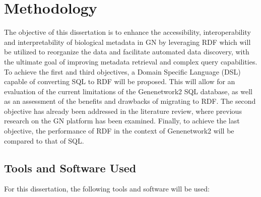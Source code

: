 \chapter{Methodology}

The objective of this dissertation is to enhance the accessibility, interoperability and interpretability of biological metadata in GN by leveraging RDF which will be utilized to reorganize the data and facilitate automated data discovery, with the ultimate goal of improving metadata retrieval and complex query capabilities.  To achieve the first and third objectives, a Domain Specific Language (DSL) capable of converting SQL to RDF will be proposed.  This will allow for an evaluation of the current limitations of the Genenetwork2 SQL database, as well as an assessment of the benefits and drawbacks of migrating to RDF.  The second objective has already been addressed in the literature review, where previous research on the GN platform has been examined.  Finally, to achieve the last objective, the performance of RDF in the context of Genenetwork2 will be compared to that of SQL.

\section{Tools and Software Used}

For this dissertation, the following tools and software will be used:

